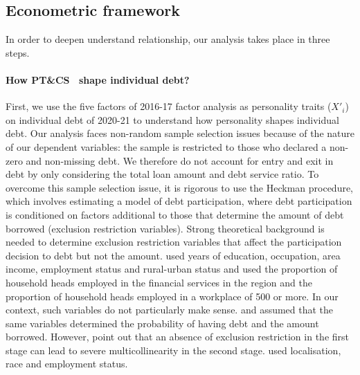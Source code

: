 \documentclass[a4paper, 12pt, onecolumn]{article}
\newcommand{\PTCS}{PT\&CS}
\begin{document}


	\subsection{Econometric framework}
	\label{subsection:econometricframework}

In order to deepen understand relationship, our analysis takes place in three steps.
\paragraph{How \PTCS~ shape individual debt?}
First, we use the five factors of 2016-17 factor analysis as personality traits ($X'_{i}$) on individual debt of 2020-21 to understand how personality shapes individual debt.
Our analysis faces non-random sample selection issues because of the nature of our dependent variables: the sample is restricted to those who declared a non-zero and non-missing debt.
We therefore do not account for entry and exit in debt by only considering the total loan amount and debt service ratio.
To overcome this sample selection issue, it is rigorous to use the Heckman procedure, which involves estimating a model of debt participation, where debt participation is conditioned on factors additional to those that determine the amount of debt borrowed (exclusion restriction variables).
Strong theoretical background is needed to determine exclusion restriction variables that affect the participation decision to debt but not the amount.
\cite{Cox1993} used years of education, occupation, area income, employment status and rural-urban status and \cite{Bertaut2002} used the proportion of household heads employed in the financial services in the region and the proportion of household heads employed in a workplace of 500 or more.
In our context, such variables do not particularly make sense.
\cite{Duca1993} and \cite{Crook2001} assumed that the same variables determined the probability of having debt and the amount borrowed.
However, \cite{Lennox2011} point out that an absence of exclusion restriction in the first stage can lead to severe multicollinearity in the second stage.
\cite{Rio2006} used localisation, race and employment status.
\end{document}
